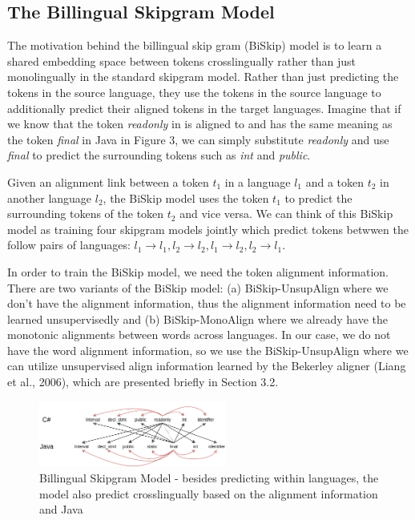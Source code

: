 \subsection{The Billingual Skipgram Model}
The motivation behind the billingual skip gram (BiSkip) model is to learn a shared embedding space between tokens crosslingually rather than just monolingually in the standard skipgram model. Rather than just predicting the tokens in the source language, they use the tokens in the source language to additionally predict their aligned tokens in the target languages. Imagine that if we know that the token \textit{readonly} in  is aligned to and has the same meaning as the token \textit{final} in Java in Figure 3, we can simply substitute \textit{readonly} and use \textit{final} to predict the surrounding tokens such as \textit{int} and \textit{public}. 

Given an alignment link between a token $t_{1}$ in a language $l_{1}$ and a token $t_{2}$ in another language $l_{2}$, the BiSkip model uses the token $t_{1}$ to predict the surrounding tokens of the token $t_{2}$ and vice versa. We can think of this BiSkip model as training four skipgram models jointly which predict tokens betwwen the follow pairs of languages: $l_{1} \rightarrow l_{1}, l_{2} \rightarrow l_{2}, l_{1} \rightarrow l_{2}, l_{2} \rightarrow l_{1}$.

In order to train the BiSkip model, we need the token alignment information. There are two variants of the BiSkip model: (a) BiSkip-UnsupAlign where we don't have the alignment information, thus the alignment information need to be learned unsupervisedly and (b) BiSkip-MonoAlign where we already have the monotonic alignments between words across languages. In our case, we do not have the word alignment information, so we use the BiSkip-UnsupAlign where we can utilize unsupervised align information learned by the Bekerley aligner (Liang et al., 2006), which are presented briefly in Section 3.2.


\begin{figure}[t!]
	\includegraphics[width=0.55\textwidth]{biskip_align}
	\caption{Billingual Skipgram Model - besides predicting within languages, the model also predict crosslingually based on the alignment information  and Java}
	\label{fig:clf}
\end{figure}

